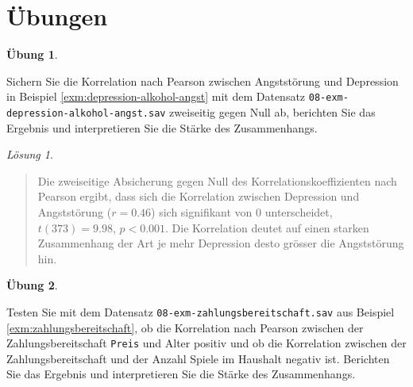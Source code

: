 \documentclass[
]{book}
\theoremstyle{definition}
\theoremstyle{definition}
\theoremstyle{definition}
\newtheorem{exercise}{Übung}[chapter]
\theoremstyle{definition}
\theoremstyle{remark}
\newtheorem*{solution}{Lösung}
\begin{document}
\section{Übungen}\label{uxfcbungen-5}

\begin{exercise}
\protect\hypertarget{exr:depression-alkohol-angst-berichten}{}\label{exr:depression-alkohol-angst-berichten}\leavevmode

Sichern Sie die Korrelation nach Pearson zwischen Angststörung und Depression in Beispiel \ref{exm:depression-alkohol-angst} mit dem Datensatz \texttt{08-exm-depression-alkohol-angst.sav} zweiseitig gegen Null ab, berichten Sie das Ergebnis und interpretieren Sie die Stärke des Zusammenhangs.

\end{exercise}

\begin{solution}
\leavevmode

\begin{quote}
Die zweiseitige Absicherung gegen Null des Korrelationskoeffizienten nach Pearson ergibt, dass sich die Korrelation zwischen Depression und Angststörung (\(r = 0.46\)) sich signifikant von \(0\) unterscheidet, \(t(373) = 9.98\), \(p < 0.001\). Die Korrelation deutet auf einen starken Zusammenhang der Art je mehr Depression desto grösser die Angststörung hin.
\end{quote}

\end{solution}

\begin{exercise}
\protect\hypertarget{exr:zahlungsbereitschaft-berichten}{}\label{exr:zahlungsbereitschaft-berichten}\leavevmode

Testen Sie mit dem Datensatz \texttt{08-exm-zahlungsbereitschaft.sav} aus Beispiel \ref{exm:zahlungsbereitschaft}, ob die Korrelation nach Pearson zwischen der Zahlungsbereitschaft \texttt{Preis} und Alter positiv und ob die Korrelation zwischen der Zahlungsbereitschaft und der Anzahl Spiele im Haushalt negativ ist. Berichten Sie das Ergebnis und interpretieren Sie die Stärke des Zusammenhangs.

\end{exercise}
\end{document}
